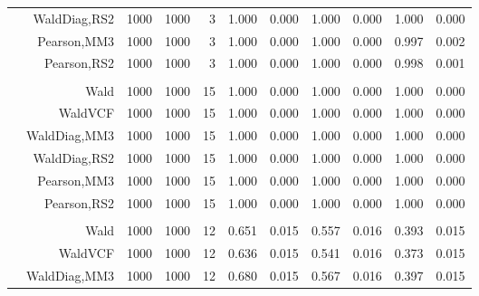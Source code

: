 \documentclass[
]{article}
\begin{document}
\begin{table}[H]
{\begin{tabular}[t]{lrrrrrrrlrr}
\hspace{1em} & WaldDiag,RS2 & 1000 & 1000 & 3 & 1.000 & 0.000 & 1.000 & 0.000 & 1.000 & 0.000\\

\hspace{1em} & Pearson,MM3 & 1000 & 1000 & 3 & 1.000 & 0.000 & 1.000 & 0.000 & 0.997 & 0.002\\

\hspace{1em} & Pearson,RS2 & 1000 & 1000 & 3 & 1.000 & 0.000 & 1.000 & 0.000 & 0.998 & 0.001\\
\cmidrule{1-11}
\addlinespace[0.3em]
\multicolumn{11}{l}{\textbf{1F 15V}}\\
\hspace{1em} & Wald & 1000 & 1000 & 15 & 1.000 & 0.000 & 1.000 & 0.000 & 1.000 & 0.000\\

\hspace{1em} & WaldVCF & 1000 & 1000 & 15 & 1.000 & 0.000 & 1.000 & 0.000 & 1.000 & 0.000\\

\hspace{1em} & WaldDiag,MM3 & 1000 & 1000 & 15 & 1.000 & 0.000 & 1.000 & 0.000 & 1.000 & 0.000\\

\hspace{1em} & WaldDiag,RS2 & 1000 & 1000 & 15 & 1.000 & 0.000 & 1.000 & 0.000 & 1.000 & 0.000\\

\hspace{1em} & Pearson,MM3 & 1000 & 1000 & 15 & 1.000 & 0.000 & 1.000 & 0.000 & 1.000 & 0.000\\

\hspace{1em} & Pearson,RS2 & 1000 & 1000 & 15 & 1.000 & 0.000 & 1.000 & 0.000 & 1.000 & 0.000\\
\cmidrule{1-11}
\addlinespace[0.3em]
\multicolumn{11}{l}{\textbf{2F 10V}}\\
\hspace{1em} & Wald & 1000 & 1000 & 12 & 0.651 & 0.015 & 0.557 & 0.016 & 0.393 & 0.015\\

\hspace{1em} & WaldVCF & 1000 & 1000 & 12 & 0.636 & 0.015 & 0.541 & 0.016 & 0.373 & 0.015\\

\hspace{1em} & WaldDiag,MM3 & 1000 & 1000 & 12 & 0.680 & 0.015 & 0.567 & 0.016 & 0.397 & 0.015\\


\end{tabular}}
\end{table}
\end{document}
